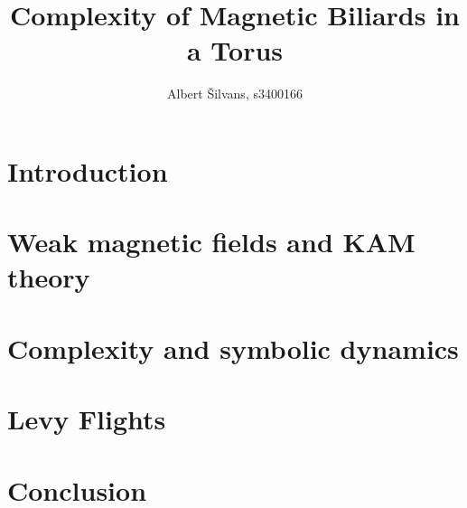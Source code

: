 \documentclass[notitlepage, a4paper]{article}
\title{Complexity of Magnetic Biliards in a Torus}
\author{Albert \v{S}ilvans, s3400166}
\theoremstyle{definition}
\begin{document}
\maketitle
\newpage
\tableofcontents
\listoffigures
\listoftables
\newpage

\section{Introduction}


\newpage
%
%
%
%

\section{Weak magnetic fields and KAM theory}




\newpage

\section{Complexity and symbolic dynamics}



\newpage

\section{Levy Flights}
\newpage

\section{Conclusion}

\newpage



\end{document}
